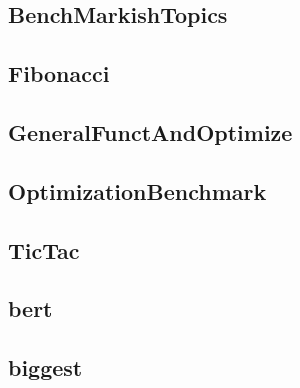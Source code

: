 
\newpage
\subsection{BenchMarkishTopics}
    \begin{figure}[h]
	    \centering
		
	\end{figure}
    


\newpage
\subsection{Fibonacci}
    \begin{figure}[h]
	    \centering
		
	\end{figure}
    


\newpage
\subsection{GeneralFunctAndOptimize}
    \begin{figure}[h]
	    \centering
		
	\end{figure}
    


\newpage
\subsection{OptimizationBenchmark}
    \begin{figure}[h]
	    \centering
		
	\end{figure}
    


\newpage
\subsection{TicTac}
    \begin{figure}[h]
	    \centering
		
	\end{figure}
    


\newpage
\subsection{bert}
    \begin{figure}[h]
	    \centering
		
	\end{figure}
    


\newpage
\subsection{biggest}
    \begin{figure}[h]
	    \centering
		
	\end{figure}
    


